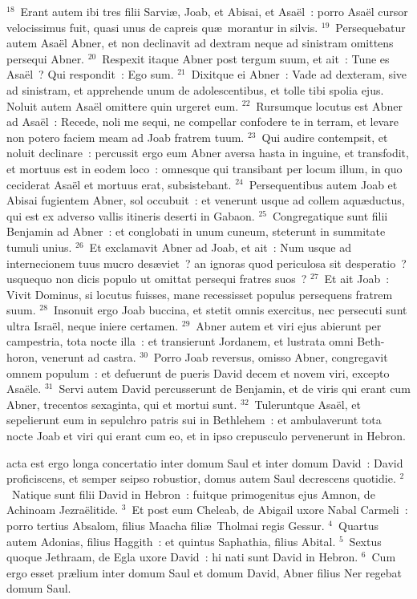 ${}^{18}$~Erant autem ibi tres filii Sarvi\ae , Joab, et Abisai, et Asa\"el~: porro Asa\"el cursor velocissimus fuit, quasi unus de capreis qu\ae\ morantur in silvis.
${}^{19}$~Persequebatur autem Asa\"el Abner, et non declinavit ad dextram neque ad sinistram omittens persequi Abner.
${}^{20}$~Respexit itaque Abner post tergum suum, et ait~: Tune es Asa\"el~? Qui respondit~: Ego sum.
${}^{21}$~Dixitque ei Abner~: Vade ad dexteram, sive ad sinistram, et apprehende unum de adolescentibus, et tolle tibi spolia ejus. Noluit autem Asa\"el omittere quin urgeret eum.
${}^{22}$~Rursumque locutus est Abner ad Asa\"el~: Recede, noli me sequi, ne compellar confodere te in terram, et levare non potero faciem meam ad Joab fratrem tuum.
${}^{23}$~Qui audire contempsit, et noluit declinare~: percussit ergo eum Abner aversa hasta in inguine, et transfodit, et mortuus est in eodem loco~: omnesque qui transibant per locum illum, in quo ceciderat Asa\"el et mortuus erat, subsistebant.
${}^{24}$~Persequentibus autem Joab et Abisai fugientem Abner, sol occubuit~: et venerunt usque ad collem aqu\ae ductus, qui est ex adverso vallis itineris deserti in Gabaon.
${}^{25}$~Congregatique sunt filii Benjamin ad Abner~: et conglobati in unum cuneum, steterunt in summitate tumuli unius.
${}^{26}$~Et exclamavit Abner ad Joab, et ait~: Num usque ad internecionem tuus mucro des\ae viet~? an ignoras quod periculosa sit desperatio~? usquequo non dicis populo ut omittat persequi fratres suos~?
${}^{27}$~Et ait Joab~: Vivit Dominus, si locutus fuisses, mane recessisset populus persequens fratrem suum.
${}^{28}$~Insonuit ergo Joab buccina, et stetit omnis exercitus, nec persecuti sunt ultra Isra\"el, neque iniere certamen.
${}^{29}$~Abner autem et viri ejus abierunt per campestria, tota nocte illa~: et transierunt Jordanem, et lustrata omni Beth-horon, venerunt ad castra.
${}^{30}$~Porro Joab reversus, omisso Abner, congregavit omnem populum~: et defuerunt de pueris David decem et novem viri, excepto Asa\"ele.
${}^{31}$~Servi autem David percusserunt de Benjamin, et de viris qui erant cum Abner, trecentos sexaginta, qui et mortui sunt.
${}^{32}$~Tuleruntque Asa\"el, et sepelierunt eum in sepulchro patris sui in Bethlehem~: et ambulaverunt tota nocte Joab et viri qui erant cum eo, et in ipso crepusculo pervenerunt in Hebron.

\bchapter
{}acta est ergo longa concertatio inter domum Saul et inter domum David~: David proficiscens, et semper seipso robustior, domus autem Saul decrescens quotidie.
${}^{2}$~Natique sunt filii David in Hebron~: fuitque primogenitus ejus Amnon, de Achinoam Jezra\"elitide.
${}^{3}$~Et post eum Cheleab, de Abigail uxore Nabal Carmeli~: porro tertius Absalom, filius Maacha fili\ae\ Tholmai regis Gessur.
${}^{4}$~Quartus autem Adonias, filius Haggith~: et quintus Saphathia, filius Abital.
${}^{5}$~Sextus quoque Jethraam, de Egla uxore David~: hi nati sunt David in Hebron.
${}^{6}$~Cum ergo esset pr\ae lium inter domum Saul et domum David, Abner filius Ner regebat domum Saul.


